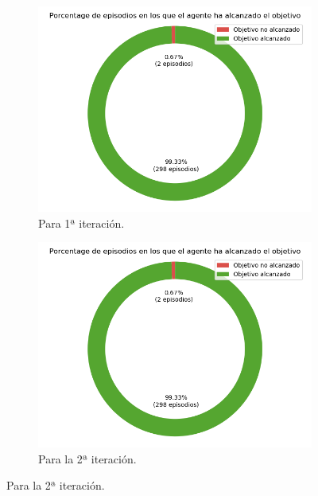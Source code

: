 \begin{figure}
    \centering
    \begin{subfigure}{.5\textwidth}
        \centering
        \includegraphics[scale=0.3]{cap5_experimentacion/images/CHANGE_ORIGIN-20_09-00_57-2, 0, 1_it1_porcentajeResuelto.png}
        \caption{Para 1ª iteración.}
        \label{fig:CHANGE_ORIGIN-20_09-00_57-2, 0, 1_it1_porcentajeResuelto}
    \end{subfigure}%
    \begin{subfigure}{.5\textwidth}
        \centering
        \includegraphics[scale=0.3]{cap5_experimentacion/images/CHANGE_ORIGIN-20_09-00_57-2, 0, 1_it2_porcentajeResuelto.png}
        \caption{Para la 2ª iteración.}
        \label{fig:CHANGE_ORIGIN-20_09-00_57-2, 0, 1_it2_porcentajeResuelto}

\end{subfigure}
\end{figure}
